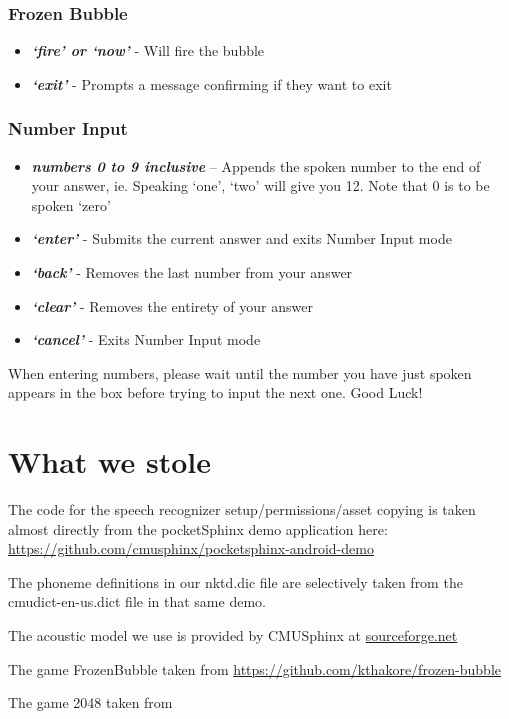 \documentclass[11pt, oneside]{article}
\begin{document}
\subsubsection*{Frozen Bubble}

\begin{itemize}
	\item {\em\bf`fire' or `now'} - Will fire the bubble
	\item {\em\bf`exit'} - Prompts a message confirming if they want to exit
	
\end{itemize}

\pagebreak

\subsubsection*{Number Input}
\begin{itemize}
  \item {\em\bf numbers 0 to 9 inclusive} – Appends the spoken number
    to the end of your answer, ie. Speaking `one', `two' will give you
    12. Note that 0 is to be spoken `zero'
  \item {\em\bf `enter'} - Submits the current answer and exits Number
    Input mode
  \item {\em\bf `back'} - Removes the last number from your answer
  \item {\em\bf `clear'} - Removes the entirety of your answer
  \item {\em\bf `cancel'} - Exits Number Input mode
\end{itemize}

When entering numbers, please wait until the number you have just spoken appears
in the box before trying to input the next one.
Good Luck!

\section*{What we stole}

The code for the speech recognizer setup/permissions/asset copying is
taken almost directly from the pocketSphinx demo application here:
\url{https://github.com/cmusphinx/pocketsphinx-android-demo}

The phoneme definitions in our nktd.dic file are selectively taken
from the cmudict-en-us.dict file in that same demo.

The acoustic model we use is provided by CMUSphinx at
\href{https://sourceforge.net/projects/cmusphinx/files/Acoustic\%20and\%20Language\%20Models/US\%20English/}{sourceforge.net}

The game FrozenBubble taken from
\url{https://github.com/kthakore/frozen-bubble}

The game 2048 taken from
    
\end{document}
